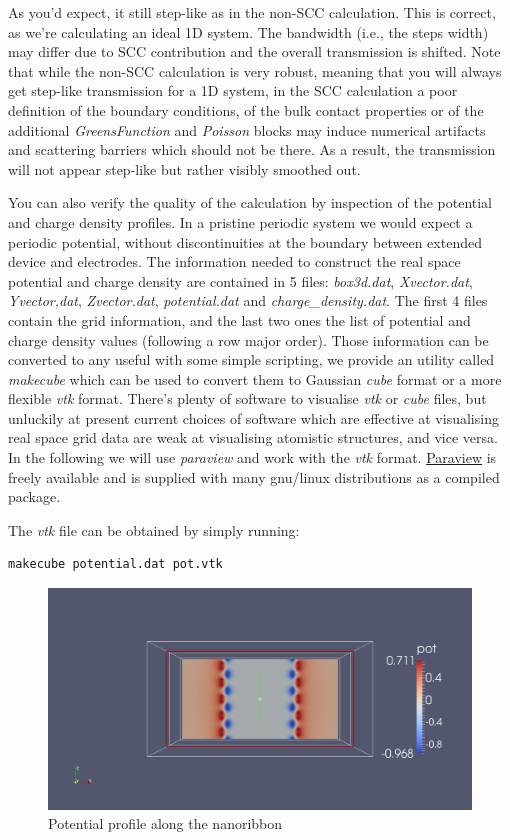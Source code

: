 \documentclass[a4paper,11pt,english]{sphinxmanual}
\begin{document}
{{As you'd expect, it still step-like as in the non-SCC
calculation. This is correct, as we're calculating an ideal 1D
system. The bandwidth (i.e., the steps width) may differ due to SCC
contribution and the overall transmission is shifted. Note that while
the non-SCC calculation is very robust, meaning that you will always
get step-like transmission for a 1D system, in the SCC calculation a
poor definition of the boundary conditions, of the bulk contact
properties or of the additional \emph{GreensFunction} and \emph{Poisson} blocks
may induce numerical artifacts and scattering barriers which should
not be there. As a result, the transmission will not appear step-like
but rather visibly smoothed out.

You can also verify the quality of the calculation by inspection of
the potential and charge density profiles. In a pristine periodic
system we would expect a periodic potential, without discontinuities
at the boundary between extended device and electrodes. The
information needed to construct the real space potential and charge
density are contained in 5 files: \emph{box3d.dat}, \emph{Xvector.dat},
\emph{Yvector,dat}, \emph{Zvector.dat}, \emph{potential.dat} and
\emph{charge\_density.dat}. The first 4 files contain the grid information,
and the last two ones the list of potential and charge density values
(following a row major order). Those information can be converted to
any useful with some simple scripting, we provide an utility called
\emph{makecube} which can be used to convert them to Gaussian \emph{cube} format
or a more flexible \emph{vtk} format. There's plenty of software to
visualise \emph{vtk} or \emph{cube} files, but unluckily at present current
choices of software which are effective at visualising real space grid
data are weak at visualising atomistic structures, and vice versa. In
the following we will use \emph{paraview} and work with the \emph{vtk}
format. \href{http://www.paraview.org}{Paraview} is freely available and
is supplied with many gnu/linux distributions as a compiled package.

The \emph{vtk} file can be obtained by simply running:

\begin{Verbatim}[commandchars=\\\{\}]
makecube potential.dat pot.vtk
\end{Verbatim}
\begin{figure}[htbp]
\centering
\capstart

\includegraphics[width=0.800\linewidth]{clip_pot.png}
\caption{Potential profile along the nanoribbon}\label{transport:fig-clip-pot}\end{figure}

}}
\end{document}
